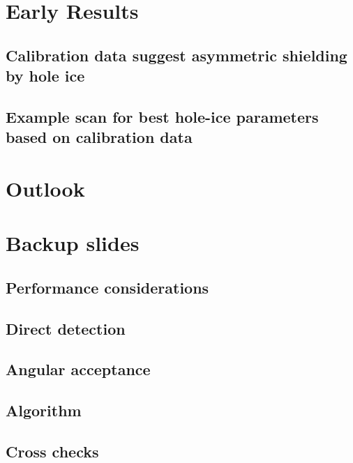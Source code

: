 \documentclass[green, 12pt]{beamer}
\begin{document}
\section{Early Results}
\subsection{Calibration data suggest asymmetric shielding by hole ice}
  
\subsection{Example scan for best hole-ice parameters based on calibration data}
  

\section{Outlook}
  
  

\appendix
\section{Backup slides}
  

\subsection{Performance considerations}
  
  

\subsection{Direct detection}
  

\subsection{Angular acceptance}
  
  

\subsection{Algorithm}
  

\subsection{Cross checks}
  
  
  
  
\end{document}
